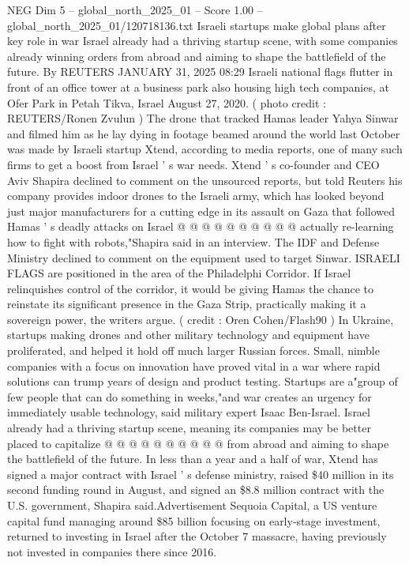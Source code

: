 \begin{textsample}{NEG Dim 5 – global\_north\_2025\_01 – Score 1.00 – global\_north\_2025\_01/120718136.txt}  \label{ex:f5_neg_186}
Israeli startups make global plans after key role in war Israel already had a thriving startup scene, with some companies already winning orders from abroad and aiming to shape the battlefield of the future.
By REUTERS JANUARY 31, 2025 08:29 Israeli national flags flutter in front of an office tower at a business park also housing high tech companies, at Ofer Park in Petah Tikva, Israel August 27, 2020. ( photo credit : REUTERS/Ronen Zvulun ) The drone that tracked Hamas leader Yahya Sinwar and filmed him as he lay dying in footage beamed around the world last October was made by Israeli startup Xtend, according to media reports, one of many such firms to get a boost from Israel ' s war needs.
Xtend ' s co-founder and CEO Aviv Shapira declined to comment on the unsourced reports, but told Reuters his company provides indoor drones to the Israeli army, which has looked beyond just major manufacturers for a cutting edge in its assault on Gaza that followed Hamas ' s deadly attacks on Israel @ @ @ @ @ @ @ @ @ @ actually re-learning how to fight with robots,"Shapira said in an interview.
The IDF and Defense Ministry declined to comment on the equipment used to target Sinwar.
ISRAELI FLAGS are positioned in the area of the Philadelphi Corridor.
If Israel relinquishes control of the corridor, it would be giving Hamas the chance to reinstate its significant presence in the Gaza Strip, practically making it a sovereign power, the writers argue. ( credit : Oren Cohen/Flash90 ) In Ukraine, startups making drones and other military technology and equipment have proliferated, and helped it hold off much larger Russian forces.
Small, nimble companies with a focus on innovation have proved vital in a war where rapid solutions can trump years of design and product testing.
Startups are a"group of few people that can do something in weeks,"and war creates an urgency for immediately usable technology, said military expert Isaac Ben-Israel.
Israel already had a thriving startup scene, meaning its companies may be better placed to capitalize @ @ @ @ @ @ @ @ @ @ from abroad and aiming to shape the battlefield of the future.
In less than a year and a half of war, Xtend has signed a major contract with Israel ' s defense ministry, raised \$40 million in its second funding round in August, and signed an \$8.8 million contract with the U.S. government, Shapira said.Advertisement Sequoia Capital, a US venture capital fund managing around \$85 billion focusing on early-stage investment, returned to investing in Israel after the October 7 massacre, having previously not invested in companies there since 2016.

\end{textsample}
